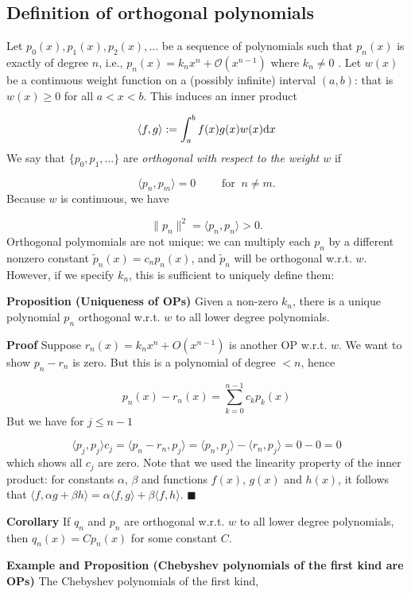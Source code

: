 \documentclass[12pt,a4paper]{article}
\begin{document}
\subsection{Definition of orthogonal polynomials}
Let $p_0(x),p_1(x),p_2(x),\ensuremath{\ldots}$ be a sequence of polynomials such that $p_n(x)$ is exactly of degree $n$, i.e., $p_n(x) = k_n x^n + \mathcal{O}(x^{n-1})$ where $k_n \neq 0$ .  Let $w(x)$ be a continuous weight function on a (possibly infinite) interval $(a,b)$: that is $w(x) \geq 0$ for all $a < x < b$. This induces an inner product

\[
\langle f,g \rangle := \int_a^b f(x) g(x) w(x) {\rm d}x
\]
We say that $\{p_0, p_1,\ldots\}$ are \emph{orthogonal with respect to the weight $w$} if

\[
\langle p_n,p_m \rangle = 0\qquad \text{ for }\: n \neq m.
\]
Because $w$ is continuous, we have

\[
\| p_n \|^2 = \langle p_n,p_n \rangle > 0 .
\]
Orthogonal polymomials are not unique: we can multiply each $p_n$ by a different nonzero constant $\tilde p_n(x) = c_n p_n(x)$, and $\tilde p_n$ will be orthogonal w.r.t. $w$.  However, if we specify $k_n$, this is sufficient to uniquely define them:

\textbf{Proposition (Uniqueness of OPs)} Given a non-zero $k_n$, there is a unique polynomial $p_n$ orthogonal w.r.t. $w$ to all lower degree polynomials.

\textbf{Proof} Suppose $r_n(x) = k_n x^n + O(x^{n-1})$ is another  OP w.r.t. $w$. We want to show $p_n - r_n$ is zero. But this is a polynomial of degree $<n$, hence

\[
p_n(x) - r_n(x) = \sum_{k=0}^{n-1} c_k p_k(x)
\]
But we have for $j \leq n-1$

\[
\langle p_j,p_j \rangle c_j = \langle p_n - r_n, p_j \rangle = \langle p_n,p_j \rangle - \langle r_n, p_j\rangle = 0 - 0 = 0
\]
which shows all $c_j$ are zero.  Note that we used the linearity property of the inner product: for constants $\alpha$, $\beta$ and functions $f(x)$, $g(x)$ and $h(x)$, it follows that $\langle  f,\alpha g + \beta h\rangle = \alpha\langle f, g\rangle + \beta\langle f, h \rangle $.  $\blacksquare$

\textbf{Corollary} If $q_n$ and $p_n$ are orthogonal w.r.t. $w$ to all lower degree polynomials, then $q_n(x) = C p_n(x)$ for some constant $C$.

\textbf{Example and Proposition (Chebyshev polynomials of the first kind are OPs)} The Chebyshev polynomials of the first kind,
\end{document}
